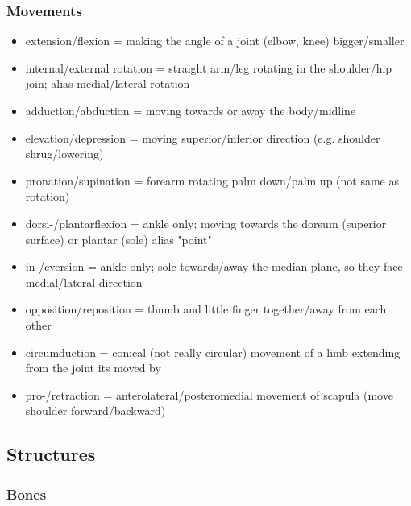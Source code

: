 \subsubsection{Movements}

\begin{itemize}
    \setlength\itemsep{0em}
    \item extension/flexion = making the angle of a joint (elbow, knee) bigger/smaller
    \item internal/external rotation = straight arm/leg rotating in the shoulder/hip join; alias medial/lateral rotation
    \item adduction/abduction = moving towards or away the body/midline
    \item elevation/depression = moving superior/inferior direction (e.g. shoulder shrug/lowering)
    \item pronation/supination = forearm rotating palm down/palm up (not same as rotation)
    \item dorsi-/plantarflexion = ankle only; moving towards the dorsum (superior surface) or plantar (sole) alias "point"
    \item in-/eversion = ankle only; sole towards/away the median plane, so they face medial/lateral direction
    \item opposition/reposition = thumb and little finger together/away from each other
    \item circumduction = conical (not really circular) movement of a limb extending from the joint its moved by
    \item pro-/retraction = anterolateral/posteromedial movement of scapula (move shoulder forward/backward)
\end{itemize}

\subsection{Structures}\label{subsec:structures}

\subsubsection{Bones}

